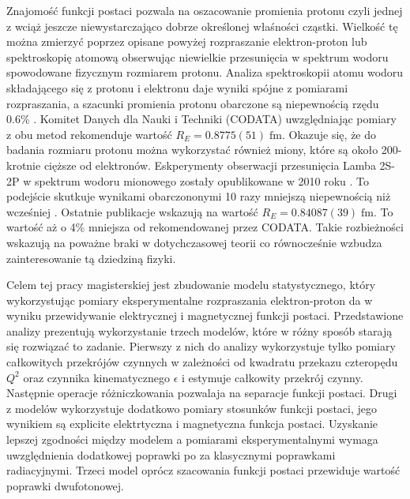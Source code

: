 \documentclass[11pt]{book}
\theoremstyle{definition}
\begin{document}
Znajomość funkcji postaci pozwala na oszacowanie promienia protonu czyli jednej z wciąż jeszcze niewystarczająco dobrze określonej właśności cząstki. Wielkość tę można zmierzyć poprzez opisane powyżej rozpraszanie elektron-proton lub spektroskopię atomową obserwując niewielkie przesunięcia w spektrum wodoru spowodowane fizycznym rozmiarem protonu. Analiza spektroskopii atomu wodoru składającego się z protonu i elektronu daje wyniki spójne z pomiarami rozpraszania, a szacunki promienia protonu obarczone są niepewnością rzędu 0.6\% \cite{Carlson:2015jba}. Komitet Danych dla Nauki i Techniki (CODATA) uwzględniając pomiary z obu metod rekomenduje wartość \cite{2012RvMP...84.1527M} $R_E = 0.8775(51) \; \text{fm}$. Okazuje się, że do badania rozmiaru protonu można wykorzystać również miony, które są około 200-krotnie cięższe od elektronów. Eskperymenty obserwacji przesunięcia Lamba 2S-2P w spektrum wodoru mionowego zostały opublikowane w 2010 roku \cite{2010Nature..Pohl}. To podejście skutkuje wynikami obarczononymi 10 razy mniejszą niepewnością niż wcześniej \cite{Carlson:2015jba}. Ostatnie publikacje  \cite{Antognini417} wskazują na wartość $R_E = 0.84087(39) \; \text{fm}.$ To wartość aż o 4\% mniejsza od rekomendowanej przez CODATA. Takie rozbieżności wskazują na poważne braki w dotychczasowej teorii co równocześnie wzbudza zainteresowanie tą dziedziną fizyki.

Celem tej pracy magisterskiej jest zbudowanie modelu statystycznego, który wykorzystując pomiary eksperymentalne rozpraszania elektron-proton da w wyniku przewidywanie elektrycznej i magnetycznej funkcji postaci. Przedstawione analizy prezentują wykorzystanie trzech modelów, które w różny sposób starają się rozwiązać to zadanie. Pierwszy z nich do analizy wykorzystuje tylko pomiary całkowitych przekrójów czynnych w zależności od kwadratu przekazu czteropędu $Q^2$ oraz czynnika kinematycznego $\epsilon$ i estymuje całkowity przekrój czynny. Następnie operacje różniczkowania pozwalaja na separacje funkcji postaci. Drugi z modelów wykorzystuje dodatkowo pomiary stosunków funkcji postaci, jego wynikiem są explicite elektrtyczna i magnetyczna funkcja postaci. Uzyskanie lepszej zgodności między modelem a pomiarami eksperymentalnymi wymaga uwzględnienia dodatkowej poprawki po za klasycznymi poprawkami radiacyjnymi. Trzeci model oprócz szacowania funkcji postaci przewiduje wartość poprawki dwufotonowej.
\end{document}
